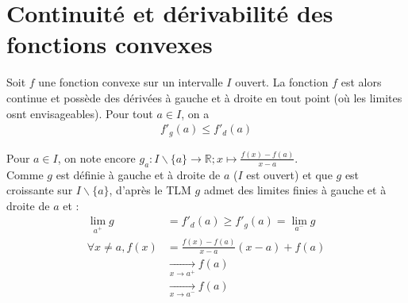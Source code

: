 \documentclass[../main.tex]{subfiles}
\begin{document}
\section{Continuité et dérivabilité des fonctions convexes}
\begin{tcolorbox}[title=Théorème 19.9, title filled=false, colframe=orange, colback=orange!10!white]
    Soit $f$ une fonction convexe sur un intervalle $I$ ouvert. La fonction $f$ est alors continue et possède des dérivées à gauche et à droite en tout point (où les limites osnt envisageables). Pour tout $a \in I$, on a
    \begin{align*}
        f'_g(a) \leq f'_d(a)
    \end{align*}
\end{tcolorbox}

\noindent Pour $a \in I$, on note encore $g_a:I\backslash\{a\}\to \mathbb{R}; x\mapsto \frac{f(x) - f(a)}{x - a}$. \\
Comme $g$ est définie à gauche et à droite de $a$ ($I$ est ouvert) et que $g$ est croissante sur $I\backslash\{a\}$, d'après le TLM $g$ admet des limites finies à gauche et à droite de $a$ et : 
\begin{align*}
    \lim_{a^+} g &= f'_d(a) \geq f'_g(a) = \lim_{a^-} g \\
    \forall x \neq a, f(x) &= \frac{f(x) - f(a)}{x-a}(x-a) + f(a) \\
    &\underset{x \to a^+}{\longrightarrow} f(a) \\
    &\underset{x \to a^-}{\longrightarrow} f(a)
\end{align*}
\end{document}
